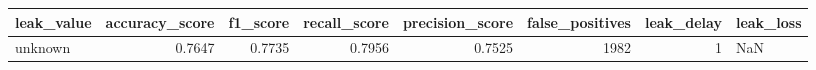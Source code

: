 \begin{tabular}{lrrrrrrl}
\toprule
leak\_value & accuracy\_score & f1\_score & recall\_score & precision\_score & false\_positives & leak\_delay & leak\_loss \\
\midrule
unknown & 0.7647 & 0.7735 & 0.7956 & 0.7525 & 1982 & 1 & NaN \\
\bottomrule
\end{tabular}
